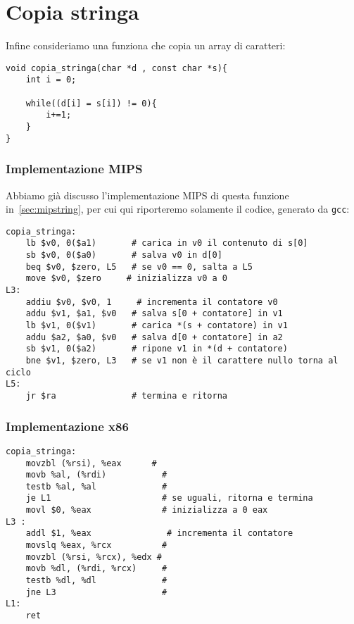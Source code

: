 \documentclass[class=book, crop=false, oneside]{standalone}
\begin{document}
\section{Copia stringa}
Infine consideriamo una funziona che copia un array di caratteri:
\begin{verbatim}
void copia_stringa(char *d , const char *s){
	int i = 0;

	while((d[i] = s[i]) != 0){
		i+=1;
	}
}
\end{verbatim}

\subsubsection{Implementazione MIPS}
Abbiamo già discusso l'implementazione MIPS di questa funzione in~\ref{sec:mipstring}, per cui qui riporteremo solamente il codice, generato da \texttt{gcc}:
\begin{verbatim}
copia_stringa:
	lb $v0, 0($a1)	     # carica in v0 il contenuto di s[0]
	sb $v0, 0($a0)	     # salva v0 in d[0]
	beq $v0, $zero, L5	 # se v0 == 0, salta a L5
	move $v0, $zero	    # inizializza v0 a 0
L3:
	addiu $v0, $v0, 1	  # incrementa il contatore v0
	addu $v1, $a1, $v0	 # salva s[0 + contatore] in v1
	lb $v1, 0($v1)	     # carica *(s + contatore) in v1
	addu $a2, $a0, $v0	 # salva d[0 + contatore] in a2
	sb $v1, 0($a2)	     # ripone v1 in *(d + contatore)
	bne $v1, $zero, L3	 # se v1 non è il carattere nullo torna al ciclo
L5:
	jr $ra	             # termina e ritorna
\end{verbatim}

\subsubsection{Implementazione x86}

\begin{verbatim}
copia_stringa:
	movzbl (%rsi), %eax	     #
	movb %al, (%rdi)           #
	testb %al, %al             #
	je L1                      # se uguali, ritorna e termina
	movl $0, %eax	           # inizializza a 0 eax
L3 :
	addl $1, %eax	            # incrementa il contatore
	movslq %eax, %rcx 	       #
	movzbl (%rsi, %rcx), %edx #
	movb %dl, (%rdi, %rcx)	   #
	testb %dl, %dl	           #
	jne L3	                   #
L1:
	ret
\end{verbatim}
\end{document}
